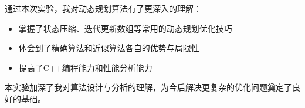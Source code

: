 \documentclass[UTF8,12pt,a4paper]{ctexart}
\begin{document}
通过本次实验，我对动态规划算法有了更深入的理解：

\begin{itemize}
	\item 掌握了状态压缩、迭代更新数组等常用的动态规划优化技巧
	\item 体会到了精确算法和近似算法各自的优势与局限性
	\item 提高了C++编程能力和性能分析能力
\end{itemize}

本实验加深了我对算法设计与分析的理解，为今后解决更复杂的优化问题奠定了良好的基础。
\end{document}
